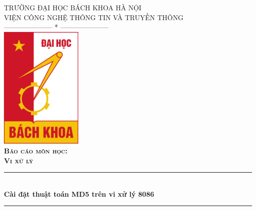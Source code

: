 \documentclass[../report.tex]{subfiles}
\begin{document}
\begin{titlepage}

\newcommand{\HRule}{\rule{\linewidth}{0.5mm}} %

\center %
\textsc{\Large TRƯỜNG ĐẠI HỌC BÁCH KHOA HÀ NỘI}\\[1cm] %
\textsc{\Large VIỆN CÔNG NGHỆ THÔNG TIN VÀ TRUYỀN THÔNG}\\[0.3cm]
\textsc{\Large ---------------------  *  ---------------------}\\[0.3cm]
\includegraphics[width=4cm]{hust.jpg}\\[1cm] %
 
\textsc{\large\bfseries Báo cáo môn học:} \\[0.2cm]
\textsc{\LARGE\bfseries Vi xử lý}\\[1cm] %

\HRule \\[0.4cm]
{\Huge \bfseries Cài đặt thuật toán MD5 trên vi xử lý 8086}\\[0.3cm] %
\HRule \\[1.5cm]


\end{titlepage}
\end{document}
